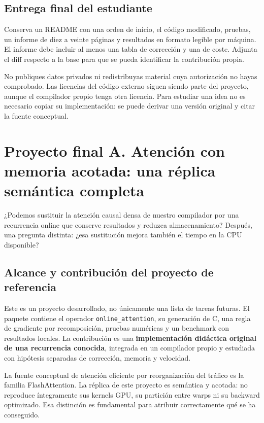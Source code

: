 \documentclass[12pt,a4paper,oneside]{report}
\begin{document}
\section{Entrega final del estudiante}
Conserva un README con una orden de inicio, el código modificado, pruebas, un informe de diez a veinte páginas y resultados en formato legible por máquina. El informe debe incluir al menos una tabla de corrección y una de coste. Adjunta el diff respecto a la base para que se pueda identificar la contribución propia.

No publiques datos privados ni redistribuyas material cuya autorización no hayas comprobado. Las licencias del código externo siguen siendo parte del proyecto, aunque el compilador propio tenga otra licencia. Para estudiar una idea no es necesario copiar su implementación: se puede derivar una versión original y citar la fuente conceptual.


\chapter{Proyecto final A. Atención con memoria acotada: una réplica semántica completa}
\label{project:atencion}
\begin{idea}
¿Podemos sustituir la atención causal densa de nuestro compilador por una recurrencia online que conserve resultados y reduzca almacenamiento? Después, una pregunta distinta: ¿esa sustitución mejora también el tiempo en la CPU disponible?

\end{idea}
\section{Alcance y contribución del proyecto de referencia}
Este es un proyecto desarrollado, no únicamente una lista de tareas futuras. El paquete contiene el operador \texttt{online\_attention}, su generación de C, una regla de gradiente por recomposición, pruebas numéricas y un benchmark con resultados locales. La contribución es una \textbf{implementación didáctica original de una recurrencia conocida}, integrada en un compilador propio y estudiada con hipótesis separadas de corrección, memoria y velocidad.

La fuente conceptual de atención eficiente por reorganización del tráfico es la familia FlashAttention. La réplica de este proyecto es semántica y acotada: no reproduce íntegramente sus kernels GPU, su partición entre warps ni su backward optimizado. Esa distinción es fundamental para atribuir correctamente qué se ha conseguido. \cite{flash1,flash2,flash3}
\end{document}
